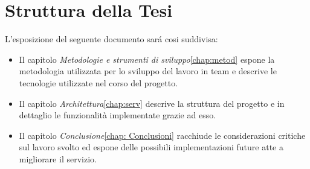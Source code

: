 \section{Struttura della Tesi}
L'esposizione del seguente documento sará cosi suddivisa:
\begin{itemize}
\item Il capitolo \emph{Metodologie e strumenti di sviluppo}\autoref{chap:metod} espone la metodologia utilizzata per lo sviluppo del lavoro in team e descrive le tecnologie utilizzate nel corso del progetto.
\item Il capitolo \emph{Architettura}\autoref{chap:serv} descrive la struttura del progetto e in dettaglio le funzionalità implementate grazie ad esso.
\item Il capitolo \emph{Conclusione}\autoref{chap: Conclusioni} racchiude le considerazioni critiche sul lavoro svolto ed espone delle possibili implementazioni future atte a migliorare il servizio.
\end{itemize}






